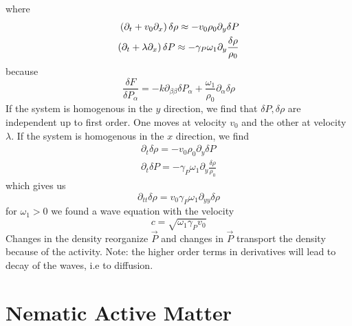 where
\begin{align}
    \left(\partial_t+v_0\partial_x\right)\delta\rho \approx -v_0\rho_0\partial_y\delta P \\
    \left(\partial_t + \lambda\partial_x\right)\delta P \approx -\gamma_P\omega_1\partial_y\frac{\delta\rho}{\rho_0}
\end{align}
because
\begin{equation}
    \frac{\delta F}{\delta P_\alpha} = -k\partial_{\beta\beta}\delta P_\alpha + \frac{\omega_1}{\rho_0}\partial_\alpha\delta\rho
\end{equation}
If the system is homogenous in the \(y\) direction, we find that \(\delta P, \delta\rho \) are independent up to first order. One moves at velocity \(v_0\) and the other at velocity \(\lambda \). If the system is homogenous in the \(x\) direction, we find
\begin{align}
    \partial_t\delta\rho = -v_0\rho_0\partial_y\delta P \\
    \partial_t\delta P = -\gamma_P\omega_1\partial_y\frac{\delta\rho}{\rho_0}
\end{align}
which gives us
\begin{equation}
    \partial_{tt}\delta\rho = v_0\gamma_P\omega_1\partial_{yy}\delta\rho 
\end{equation}
for \(\omega_1 > 0\) we found a wave equation with the velocity 
\begin{equation}
    c = \sqrt{\omega_1\gamma_P v_0}
\end{equation}
Changes in the density reorganize \(\vec{P}\) and changes in \(\vec{P}\) transport the density because of the activity. Note: the higher order terms in derivatives will lead to decay of the waves, i.e to diffusion.
\newpage
\section{Nematic Active Matter}
